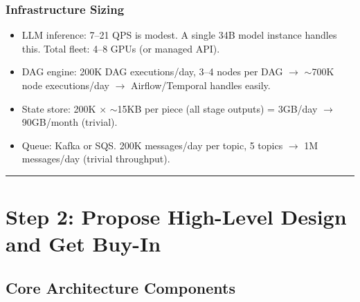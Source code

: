 \subsubsection*{Infrastructure Sizing}

\begin{itemize}
  \item LLM inference: 7--21 QPS is modest. A single 34B model instance handles this. Total fleet: 4--8 GPUs (or managed API).
  \item DAG engine: 200K DAG executions/day, 3--4 nodes per DAG $\rightarrow$ $\sim$700K node executions/day $\rightarrow$ Airflow/Temporal handles easily.
  \item State store: 200K $\times$ $\sim$15KB per piece (all stage outputs) = 3GB/day $\rightarrow$ 90GB/month (trivial).
  \item Queue: Kafka or SQS. 200K messages/day per topic, 5 topics $\rightarrow$ 1M messages/day (trivial throughput).
\end{itemize}

\bigskip\hrule\bigskip

\section*{Step 2: Propose High-Level Design and Get Buy-In}

\subsection*{Core Architecture Components}

